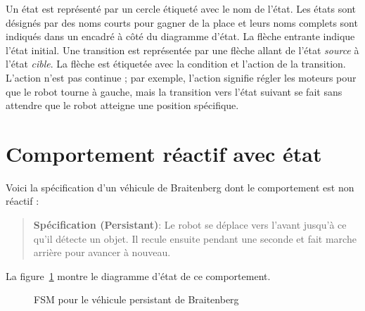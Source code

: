 Un état est représenté par un cercle étiqueté avec le nom de l'état. Les états sont désignés par des noms courts pour gagner de la place et leurs noms complets sont indiqués dans un encadré à côté du diagramme d'état. La flèche entrante indique l'état initial. Une transition est représentée par une flèche allant de l'état \emph{source} à l'état \emph{cible}. La flèche est étiquetée avec la condition et l'action de la transition. L'action n'est pas continue ; par exemple, l'action  signifie régler les moteurs pour que le robot tourne à gauche, mais la transition vers l'état suivant se fait sans attendre que le robot atteigne une position spécifique.

\section{Comportement réactif avec état}\label{s.reactive-state}

Voici la spécification d'un véhicule de Braitenberg dont le comportement est non réactif :

\begin{quote}
\normalsize\noindent\textbf{Spécification (Persistant)}: Le robot se déplace vers l'avant jusqu'à ce qu'il détecte un objet. Il recule ensuite pendant une seconde et fait marche arrière pour avancer à nouveau.
\end{quote}
La figure~\ref{fig.persistent} montre le diagramme d'état de ce comportement.

\begin{figure}
\begin{center}
\caption{FSM pour le véhicule persistant de Braitenberg}\label{fig.persistent}
\end{center}
\end{figure}

